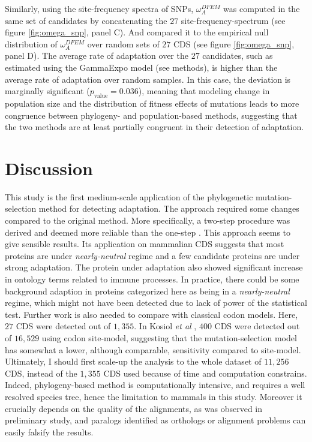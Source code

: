 \documentclass{article}
\begin{document}
	Similarly, using the site-frequency spectra of SNPs, $\omega_A^{DFEM}$ was computed in the same set of candidates by concatenating the $27$ site-frequency-spectrum (see figure \ref{fig:omega_snp}, panel C). And compared it to the empirical null distribution of $\omega_A^{DFEM}$ over random sets of $27$ CDS (see figure \ref{fig:omega_snp}, panel D).
	The average rate of adaptation over the $27$ candidates, such as estimated using the GammaExpo model (see methods), is higher than the average rate of adaptation over random samples. In this case, the deviation is marginally significant ($p_{\mathrm{value}}=0.036$), 
	meaning that modeling change in population size and the distribution of fitness effects of mutations leads to more congruence between phylogeny- and population-based methods, suggesting that the two methods are at least partially congruent in their detection of adaptation.
	
	\section*{Discussion}


	This study is the first medium-scale application of the phylogenetic mutation-selection method for detecting adaptation. The approach required some changes compared to the original method. More specifically, a two-step procedure was derived and deemed more reliable than the one-step \cite{lartillot_phylobayes_2013}. This approach seems to give sensible results. Its application on mammalian CDS suggests that most proteins are under \textit{nearly-neutral} regime and a few candidate proteins are under strong adaptation. The protein under adaptation also showed significant increase in ontology terms related to immune processes. In practice, there could be some background adaption in proteins categorized here as being in a \textit{nearly-neutral} regime, which might not have been detected due to lack of power of the statistical test. Further work is also needed to compare with classical codon models. Here, $27$ CDS were detected out of $1,355$. In Kosiol \textit{et al} \cite{kosiol_patterns_2008}, $400$ CDS were detected out of $16,529$ using codon site-model, suggesting that the mutation-selection model has somewhat a lower, although comparable, sensitivity compared to site-model. Ultimately, I should first scale-up the analysis to the whole dataset of $11,256$ CDS, instead of the $1,355$ CDS used because of time and computation constrains. Indeed, phylogeny-based method is computationally intensive, and requires a well resolved species tree, hence the limitation to mammals in this study. Moreover it crucially depends on the quality of the alignments, as was observed in preliminary study, and paralogs identified as orthologs or alignment problems can easily falsify the results.\\
	
\end{document}
